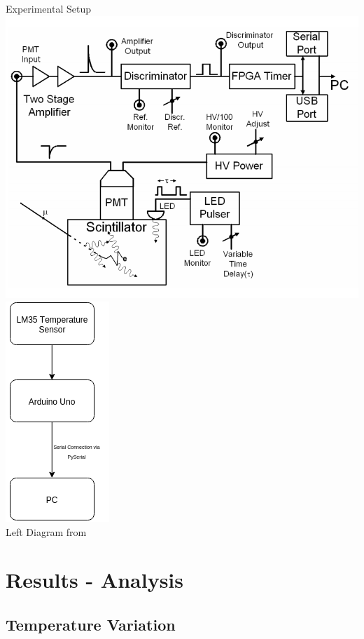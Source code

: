 \documentclass{beamer}
\begin{document}
\begin{frame}{Experimental Setup}
\centering
\includegraphics[scale=.25]{../Figures/MuonBlockDiagram.png}
\includegraphics[scale=.5]{../Figures/temperatureBlockDiagram.png}\\
\tiny{Left Diagram from \cite{muonPhysics}}


\end{frame}


\section{Results - Analysis}

\subsection{Temperature Variation}
\end{document}
